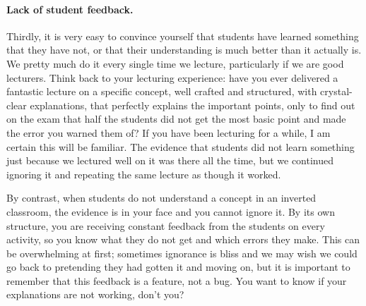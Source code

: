 \documentclass[11pt]{article}
\begin{document}
\paragraph{Lack of student feedback.} Thirdly, it is very easy to convince yourself that students have learned something that they have not, or that their understanding is much better than it actually is.  We pretty much do it every single time we lecture, particularly if we are good lecturers.   Think back to your lecturing experience: have you ever delivered a fantastic lecture on a specific concept, well crafted and structured, with crystal-clear explanations, that perfectly explains the important points, only to find out on the exam that half the students did not get the most basic point and made the error you warned them of?  If you have been lecturing for a while, I am certain this will be familiar.    The evidence that students did not learn something just because we lectured well on it was there all the time, but we continued ignoring it and repeating the same lecture as though it worked.

{\baselineskip
By contrast, when students do not understand a concept in an inverted classroom, the evidence is in your face and you cannot ignore it.   By its own structure, you are receiving constant feedback from the students on every activity, so you know what they do not get and which errors they make.    This can be overwhelming at first; sometimes ignorance is bliss and we may wish we could go back to pretending they had gotten it and moving on, but it is important to remember that this feedback is a feature, not a bug.  You want to know if your explanations are not working, don't you?\\
}
\end{document}
